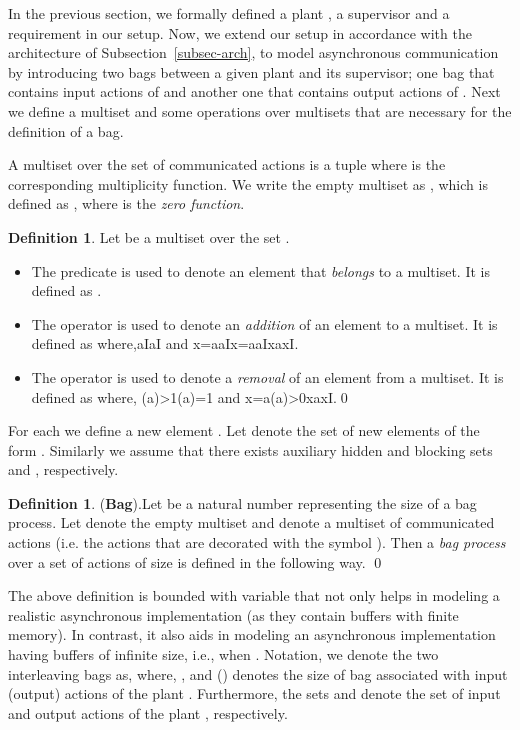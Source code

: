 \documentclass[copyright]{eptcs}
\theoremstyle{plain}
\theoremstyle{definition}
\newtheorem{definition}[theorem]{Definition}
\renewcommand{\comm}{\ensuremath{?\mkern-7mu!}}
\newcommand*\com{\mathop{\raisebox{-1pt}{\normalfont\Large\comm}}}
\begin{document}
In the previous section, we formally defined a plant , a supervisor  and a requirement  in our setup. Now, we extend our setup in accordance with the architecture of Subsection~\ref{subsec-arch}, to model asynchronous communication by introducing two bags between a given plant and its supervisor; one bag that contains input actions of  and another one that contains output actions of . Next we define a multiset and some operations over multisets that are necessary for the definition of a bag.

A multiset  over the set of communicated actions  is a tuple  where  is the corresponding multiplicity function. We write the empty multiset as , which is defined as , where  is the \emph{zero function}.

\begin{definition}
Let  be a multiset over the set .
\begin{itemize}
\item The predicate  is used to denote an element that \emph{belongs} to a multiset. It is defined as .
\item The operator  is used to denote an \emph{addition} of an element to a multiset. It is defined as  where,\newline \com a\in I\com a\not\in I and
x=\com a\wedge\com a\in Ix=\com a\wedge\com a\not\in Ix\neq\com a\wedge x\in I.
\item The operator  is used to denote a \emph{removal} of an element from a multiset. It is defined as  where,\newline
    \kappa(\com a)>1\kappa(\com a)=1 and
    x=\com a\wedge\kappa(\com a)>0x\neq\com a\wedge x\in I.\qed
\end{itemize}
\end{definition}

For each  we define a new element . Let  denote the set of new elements of the form .
Similarly we assume that there exists auxiliary hidden and blocking sets  and , respectively.

\begin{definition}{(\textbf{Bag}).}\label{bagdef}
Let  be a natural number representing the size of a bag process. Let  denote the empty multiset and  denote a multiset of communicated actions (i.e. the actions that are decorated with the symbol ). Then a \emph{bag process} over a set of actions  of size  is defined in the following way.
\qed
\end{definition}
The above definition is bounded with variable  that not only helps in modeling a realistic asynchronous implementation (as they contain buffers with finite memory). In contrast, it also aids in modeling an asynchronous implementation having buffers of infinite size, i.e., when . Notation, we denote the two interleaving bags as, 
where, ,  and  () denotes the size of bag associated with input (output) actions of the plant . Furthermore, the sets  and  denote the set of input and output actions of the plant , respectively.
\end{document}
